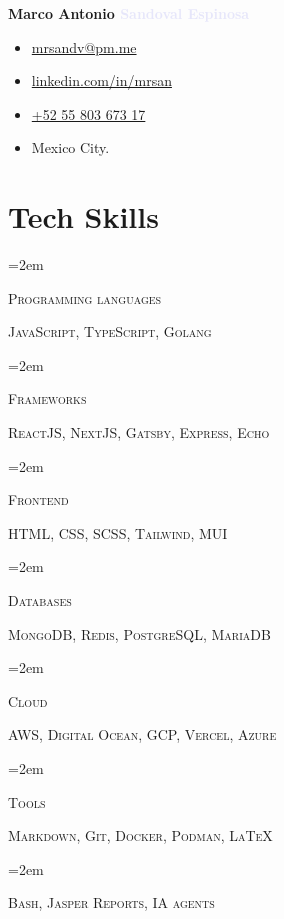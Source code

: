 \documentclass[letterpaper]{article}
\newlength{\spacebox}
\newcommand{\skill}[2]{
\noindent\hangindent=2em\hangafter=0
\parbox{3\spacebox}{
\textsc{#1}}
#2 \par
\vspace{0.5em}
}
\begin{document}
\thispagestyle{empty}
\noindent
\textbf{\Huge \textcolor{darklavender}{Marco Antonio} \textcolor{lavender}{Sandoval Espinosa}}\par

\begin{flushleft}

\end{flushleft}\par

\noindent
\begin{itemize}[itemsep=0em]
\item[\faAt] \href{mailto:mrsandv@pm.me}{mrsandv@pm.me}
\item[\faLinkedin]\href{https://linkedin.com/in/mrsan}{linkedin.com/in/mrsan}
\item[\faPhone] \href{tel:+525580367317}{+52 55 803 673 17}
\item[\faMapMarker] \textcolor{darklavender}{Mexico City.}
\end{itemize}

\section*{Tech Skills}
\skill{Programming languages}{\textsc{JavaScript},  \textsc{TypeScript},  \textsc{Golang} }
\skill{Frameworks}{\textsc{ReactJS, NextJS, Gatsby, Express, Echo}}
\skill{Frontend}{\textsc{HTML, CSS, SCSS, Tailwind, MUI}}
\skill{Databases}{\textsc{MongoDB, Redis, PostgreSQL, MariaDB}}
\skill{Cloud}{\textsc{AWS, Digital Ocean, GCP, Vercel, Azure}}
\skill{Tools}{\textsc{Markdown, Git, Docker, Podman, \LaTeX}}
\skill{ }{\textsc{Bash, Jasper Reports, IA agents}}
\end{document}
